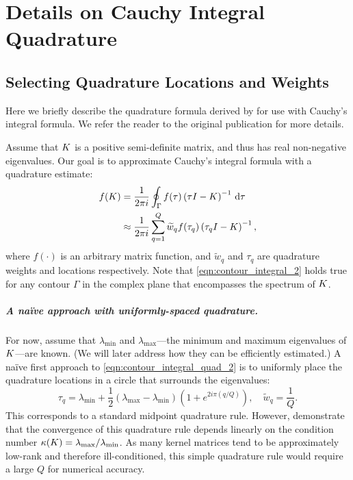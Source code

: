 \chapter{Details on Cauchy Integral Quadrature}
\label{app:quadrature}

\section{Selecting Quadrature Locations and Weights}
Here we briefly describe the quadrature formula derived by \citet{hale2008computing} for use with Cauchy's integral formula.
We refer the reader to the original publication for more details.

Assume that $K$ is a positive semi-definite matrix, and thus has real non-negative eigenvalues.
Our goal is to approximate Cauchy's integral formula with a quadrature estimate:
%
\begin{align}
	f(K)
  &= \frac{1}{2 \pi i} \oint_\Gamma f(\tau) \left( \tau I - K \right)^{-1} \,\mathrm{d}{\tau}
  \label{eqn:contour_integral_2}
  \\
  &\approx
  \frac{1}{2 \pi i} \sum_{q=1}^Q \widetilde w_q f(\tau_q) \left( \tau_q I - K \right)^{-1},
  \label{eqn:contour_integral_quad_2}
\end{align}
%
where $f(\cdot)$ is an arbitrary matrix function, and $\widetilde w_q$ and $\tau_q$ are quadrature weights and locations respectively.
Note that \cref{eqn:contour_integral_2} holds true for any contour $\Gamma$ in the complex plane that encompasses the spectrum of $K$.

\paragraph{A na\"ive approach with uniformly-spaced quadrature.}
For now, assume that $\lambda_\text{min}$ and $\lambda_\text{max}$---the minimum and maximum eigenvalues of $K$---are known.
(We will later address how they can be efficiently estimated.)
A na\"ive first approach to \cref{eqn:contour_integral_quad_2} is to uniformly place the quadrature locations in a circle that surrounds the eigenvalues:
%
\[
  \tau_q = \lambda_\text{min} + \frac 1 2 \left( \lambda_\text{max} - \lambda_\text{min} \right) \left( 1 + e^{2 i \pi \left( q / Q \right)} \right),
  \quad
  \widetilde w_q = \frac 1 Q.
\]
%
This corresponds to a standard midpoint quadrature rule.
However, \citet{hale2008computing} demonstrate that the convergence of this quadrature rule depends linearly on the condition number $\kappa(K) = \lambda_\text{max} / \lambda_\text{min}$.
As many kernel matrices tend to be approximately low-rank and therefore ill-conditioned, this simple quadrature rule would require a large $Q$ for numerical accuracy.


